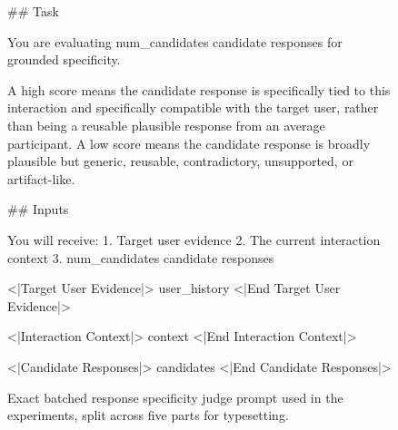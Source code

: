 \begin{figure}[p]
\centering

\begin{promptbox}
## Task

You are evaluating {num_candidates} candidate responses for grounded specificity.

A high score means the candidate response is specifically tied to this interaction and specifically compatible with the target user, rather than being a reusable plausible response from an average participant.
A low score means the candidate response is broadly plausible but generic, reusable, contradictory, unsupported, or artifact-like.

## Inputs

You will receive:
1. Target user evidence
2. The current interaction context
3. {num_candidates} candidate responses

<|Target User Evidence|>
{user_history}
<|End Target User Evidence|>

<|Interaction Context|>
{context}
<|End Interaction Context|>

<|Candidate Responses|>
{candidates}
<|End Candidate Responses|>
\end{promptbox}

\vspace{-6pt}

\caption{Exact batched response specificity judge prompt used in the experiments, split across five parts for typesetting.}
\label{fig:specificity_prompt}
\end{figure}

